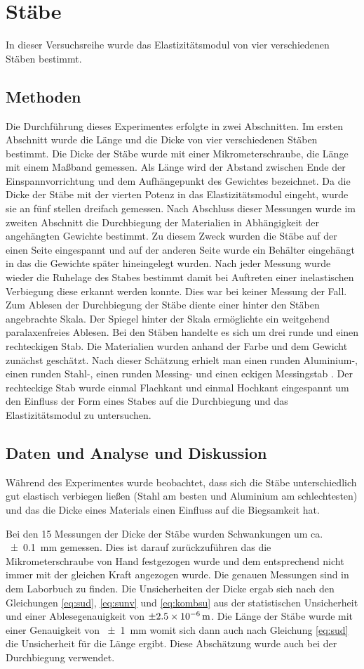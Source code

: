 \section{Stäbe}
In dieser Versuchsreihe wurde das Elastizitätsmodul von vier verschiedenen Stäben bestimmt.
\subsection{Methoden}
Die Durchführung dieses Experimentes erfolgte in zwei Abschnitten.
Im ersten Abschnitt wurde die Länge und die Dicke von vier verschiedenen Stäben bestimmt.
Die Dicke der Stäbe wurde mit einer Mikrometerschraube, die Länge  mit einem Maßband gemessen. Als Länge wird der Abstand zwischen Ende der Einspannvorrichtung   und dem Aufhängepunkt des Gewichtes bezeichnet.
Da die Dicke der Stäbe mit der vierten Potenz in das Elastizitätsmodul eingeht, wurde sie an fünf stellen dreifach gemessen.  Nach Abschluss dieser Messungen wurde im zweiten Abschnitt die Durchbiegung der Materialien in Abhängigkeit der angehängten Gewichte bestimmt. Zu diesem Zweck wurden die Stäbe auf der einen Seite eingespannt und auf der anderen Seite wurde ein Behälter eingehängt in das die Gewichte später hineingelegt wurden.
Nach jeder Messung wurde wieder die Ruhelage des Stabes bestimmt damit bei Auftreten einer inelastischen Verbiegung diese erkannt werden konnte. Dies war bei keiner Messung der Fall. Zum Ablesen der Durchbiegung der Stäbe diente einer hinter den Stäben angebrachte Skala. Der Spiegel hinter der Skala ermöglichte ein weitgehend paralaxenfreies Ablesen.
Bei den Stäben handelte es sich um drei runde und einen rechteckigen Stab. Die Materialien wurden anhand der Farbe und dem Gewicht zunächst geschätzt.
Nach dieser Schätzung erhielt man einen runden Aluminium-, einen runden Stahl-, einen runden Messing- und einen eckigen Messingstab . Der rechteckige Stab wurde einmal Flachkant und einmal Hochkant eingespannt um den Einfluss der Form eines Stabes auf die Durchbiegung und das Elastizitätsmodul zu untersuchen.

\subsection{Daten und Analyse und Diskussion}
Während des Experimentes wurde beobachtet, dass sich die Stäbe unterschiedlich gut elastisch verbiegen ließen (Stahl am besten und Aluminium am schlechtesten) und das die Dicke eines Materials 
einen Einfluss auf die Biegsamkeit hat.

Bei  den 15 Messungen der Dicke der Stäbe wurden Schwankungen um ca. \SI{+-0,1}{mm} gemessen. Dies ist darauf zurückzuführen das die Mikrometerschraube von Hand festgezogen wurde und dem entsprechend nicht immer mit der gleichen Kraft angezogen wurde.
Die genauen Messungen sind in dem Laborbuch zu finden. Die Unsicherheiten der Dicke ergab sich nach den Gleichungen \ref{eq:sud}, \ref{eq:sunv} und \ref{eq:kombsu} aus der statistischen Unsicherheit und einer Ablesegenauigkeit von $\SI{\pm 2.5e-6}{m}$.   
Die Länge der Stäbe wurde mit einer Genauigkeit von \SI{+-1}{mm} womit sich dann auch nach Gleichung \ref{eq:sud} die Unsicherheit für die Länge ergibt. Diese Abschätzung wurde auch bei der Durchbiegung verwendet.

